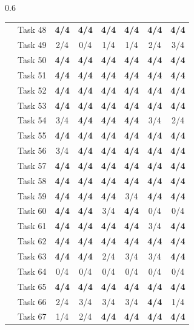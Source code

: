 \begin{table}[t]
\begin{subtable}[t]{0.6\textwidth}
\begin{tabular}{@{}llcccccc@{}}
 & Task 48 & \textbf{4/4} & \textbf{4/4} & \textbf{4/4} & \textbf{4/4} & \textbf{4/4} & \textbf{4/4} \\
 & Task 49 & 2/4 & 0/4 & 1/4 & 1/4 & 2/4 & 3/4 \\
 & Task 50 & \textbf{4/4} & \textbf{4/4} & \textbf{4/4} & \textbf{4/4} & \textbf{4/4} & \textbf{4/4} \\
 & Task 51 & \textbf{4/4} & \textbf{4/4} & \textbf{4/4} & \textbf{4/4} & \textbf{4/4} & \textbf{4/4} \\
 & Task 52 & \textbf{4/4} & \textbf{4/4} & \textbf{4/4} & \textbf{4/4} & \textbf{4/4} & \textbf{4/4} \\
 & Task 53 & \textbf{4/4} & \textbf{4/4} & \textbf{4/4} & \textbf{4/4} & \textbf{4/4} & \textbf{4/4} \\
 & Task 54 & 3/4 & \textbf{4/4} & \textbf{4/4} & \textbf{4/4} & 3/4 & 2/4 \\
 & Task 55 & \textbf{4/4} & \textbf{4/4} & \textbf{4/4} & \textbf{4/4} & \textbf{4/4} & \textbf{4/4} \\
 & Task 56 & 3/4 & \textbf{4/4} & \textbf{4/4} & \textbf{4/4} & \textbf{4/4} & \textbf{4/4} \\
 & Task 57 & \textbf{4/4} & \textbf{4/4} & \textbf{4/4} & \textbf{4/4} & \textbf{4/4} & \textbf{4/4} \\
 & Task 58 & \textbf{4/4} & \textbf{4/4} & \textbf{4/4} & \textbf{4/4} & \textbf{4/4} & \textbf{4/4} \\
 & Task 59 & \textbf{4/4} & \textbf{4/4} & \textbf{4/4} & 3/4 & \textbf{4/4} & \textbf{4/4} \\
 & Task 60 & \textbf{4/4} & \textbf{4/4} & 3/4 & \textbf{4/4} & 0/4 & 0/4 \\
 & Task 61 & \textbf{4/4} & \textbf{4/4} & \textbf{4/4} & \textbf{4/4} & 3/4 & \textbf{4/4} \\
 & Task 62 & \textbf{4/4} & \textbf{4/4} & \textbf{4/4} & \textbf{4/4} & \textbf{4/4} & \textbf{4/4} \\
 & Task 63 & \textbf{4/4} & \textbf{4/4} & 2/4 & 3/4 & 3/4 & \textbf{4/4} \\
 & Task 64 & 0/4 & 0/4 & 0/4 & 0/4 & 0/4 & 0/4 \\
 & Task 65 & \textbf{4/4} & \textbf{4/4} & \textbf{4/4} & \textbf{4/4} & \textbf{4/4} & \textbf{4/4} \\
 & Task 66 & 2/4 & 3/4 & 3/4 & 3/4 & \textbf{4/4} & 1/4 \\
 & Task 67 & 1/4 & 2/4 & \textbf{4/4} & \textbf{4/4} & \textbf{4/4} & \textbf{4/4} \\

\end{tabular}
\end{subtable}
\end{table}
